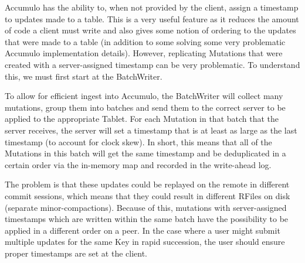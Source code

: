 Accumulo has the ability to, when not provided by the client, assign a timestamp to updates made to a table. This is a
very useful feature as it reduces the amount of code a client must write and also gives some notion of ordering to the
updates that were made to a table (in addition to some solving some very problematic Accumulo implementation details).
However, replicating Mutations that were created with a server-assigned timestamp can be very problematic. To understand
this, we must first start at the BatchWriter.

To allow for efficient ingest into Accumulo, the BatchWriter will collect many mutations, group them into batches and
send them to the correct server to be applied to the appropriate Tablet. For each Mutation in that batch that the server
receives, the server will set a timestamp that is at least as large as the last timestamp (to account for clock skew). In short,
this means that all of the Mutations in this batch will get the same timestamp and be deduplicated in a certain order
via the in-memory map and recorded in the write-ahead log.

The problem is that these updates could be replayed on the remote in different commit sessions, which means that they
could result in different RFiles on disk (separate minor-compactions). Because of this, mutations with server-assigned
timestamps which are written within the same batch have the possibility to be applied in a different order on a peer. In
the case where a user might submit multiple updates for the same Key in rapid succession, the user should ensure proper
timestamps are set at the client.
